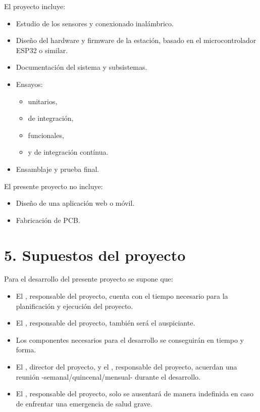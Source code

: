 \documentclass[
11pt, %
codirector, %
]{charter}
\begin{document}
El proyecto incluye:
\begin{itemize}
	\item Estudio de los sensores y conexionado inalámbrico.
	\item Diseño del hardware y firmware de la estación, basado en el microcontrolador ESP32 o similar.
	\item Documentación del sistema y subsistemas.
	\item Ensayos:
	\begin{itemize}
		\item unitarios,
		\item de integración,
		\item funcionales,
		\item y de integración contínua.
		\end{itemize}
	\item Ensamblaje y prueba final.
	
\end{itemize}

\newpage
El presente proyecto no incluye:

\begin{itemize}
	\item Diseño de una aplicación web o móvil.
	\item Fabricación de PCB.
	
\end{itemize}

\section{5. Supuestos del proyecto}
\label{sec:supuestos}

Para el desarrollo del presente proyecto se supone que:

\begin{itemize}
	\item El \authorname, responsable del proyecto, cuenta con el tiempo necesario para
la planificación y ejecución del proyecto.
	\item El \authorname, responsable del proyecto, también será el auspiciante.
	\item Los componentes necesarios para el desarrollo se conseguirán en tiempo y forma.
	\item El \supname, director del proyecto, y el \authorname, responsable del
proyecto, acuerdan una reunión -semanal/quincenal/mensual- durante el desarrollo.
	\item El \authorname, responsable del proyecto, solo se ausentará de manera indefinida en caso de enfrentar una emergencia de salud grave.
\end{itemize}
\end{document}
